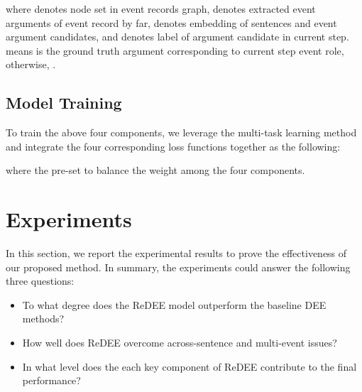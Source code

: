 \documentclass[11pt]{article}
\begin{document}
where  denotes node set in event records graph,  denotes extracted event arguments of event record by far,  denotes embedding of sentences and event argument candidates, and  denotes label of argument candidate  in current step.  means  is the ground truth argument corresponding to current step event role, otherwise, .


\subsection{Model Training}

To train the above four components, we leverage the multi-task learning method \cite{Ronan-multi-task} and integrate the four corresponding loss functions together as the following: 

where the  pre-set to balance the weight among the four components. 

\section{Experiments}

In this section, we report the experimental results to prove the effectiveness of our proposed method. In summary, the experiments could answer the following three questions:
\begin{itemize}
    \item To what degree does the ReDEE model outperform the baseline DEE methods?
    \item How well does ReDEE overcome across-sentence and multi-event issues?
    \item In what level does the each key component of ReDEE contribute to the final performance?
\end{itemize}
\end{document}
